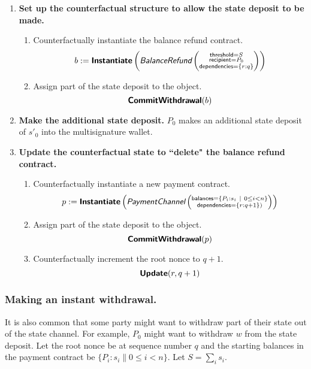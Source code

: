\documentclass[prb,floatfix,reprint,nofootinbib,amsmath,amssymb,epsfig,pre,floats,letterpaper,groupedaffiliation,tightenlines,allcolors=blue,11pt]{revtex4}
\theoremstyle{definition}
\theoremstyle{definition}
\theoremstyle{definition}
\begin{document}
\begin{enumerate}

\item \textbf{Set up the counterfactual structure to allow the state deposit to be made.}

\begin{enumerate}

\item Counterfactually instantiate the balance refund contract.
    \[
    b := \textsf{\textbf{Instantiate}}\left(
    \textit{\textsf{BalanceRefund}}\left(\substack{
    \textsf{threshold}=S \\
    \textsf{recipient}=P_0 \\
    \textsf{dependencies}=\left\{r:q\right\}
    }\right)
    \right)
\]

\item Assign part of the state deposit to the object.
\[
    \textsf{\textbf{CommitWithdrawal}}(b)
\]

\end{enumerate}

\item \textbf{Make the additional state deposit.}
$P_0$ makes an additional state deposit of $s'_0$ into the multisignature wallet.

\item \textbf{Update the counterfactual state to ``delete" the balance refund contract.}

\begin{enumerate}

\item Counterfactually instantiate a new payment contract.
\[
    p := \textsf{\textbf{Instantiate}}\left(\textit{\textsf{PaymentChannel}}\left(\substack{
    \textsf{balances}=\{P_i:s_i \ |\  0 \le i < n\}\\
    \textsf{dependencies}=\left\{r:q+1\right\})
    }\right)
    \right)
\]

\item Assign part of the state deposit to the object.
\[
    \textsf{\textbf{CommitWithdrawal}}(p)
\]

\item Counterfactually increment the root nonce to $q + 1$.
\[
\textsf{\textbf{Update}}(r, q+1)
\]
\end{enumerate}

\end{enumerate}

\subsubsection{Making an instant withdrawal.}
It is also common that some party might want to withdraw part of their state out of the state channel. For example, $P_0$ might want to withdraw $w$ from the state deposit. Let the root nonce be at sequence number $q$ and the starting balances in the payment contract be
$\{P_i : s_i \| 0 \le i < n\}$. Let $S = \sum_i s_i$.
\end{document}
